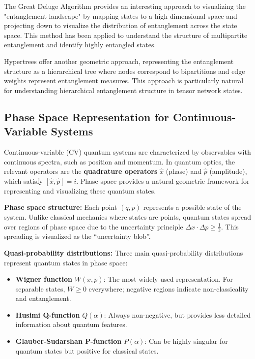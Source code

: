 \documentclass[%
 amsmath,amssymb,
 aps,
rmp,
]{revtex4-2}
\begin{document}
The Great Deluge Algorithm provides an interesting approach to visualizing the "entanglement landscape" by mapping states to a high-dimensional space and projecting down to visualize the distribution of entanglement across the state space. This method has been applied to understand the structure of multipartite entanglement and identify highly entangled states.

Hypertrees offer another geometric approach, representing the entanglement structure as a hierarchical tree where nodes correspond to bipartitions and edge weights represent entanglement measures. This approach is particularly natural for understanding hierarchical entanglement structure in tensor network states.











\subsection{Phase Space Representation for Continuous-Variable Systems}
\label{sec:cv-phase-space}

Continuous-variable (CV) quantum systems are characterized by observables with continuous spectra, such as position and momentum. In quantum optics, the relevant operators are the \textbf{quadrature operators} $\hat{x}$ (phase) and $\hat{p}$ (amplitude), which satisfy $[\hat{x}, \hat{p}] = i$. Phase space provides a natural geometric framework for representing and visualizing these quantum states.

\textbf{Phase space structure:} Each point $(q, p)$ represents a possible state of the system. Unlike classical mechanics where states are points, quantum states spread over regions of phase space due to the uncertainty principle $\Delta x \cdot \Delta p \geq \frac{1}{2}$. This spreading is visualized as the ``uncertainty blob''.

\textbf{Quasi-probability distributions:} Three main quasi-probability distributions represent quantum states in phase space:

\begin{itemize}
	\item \textbf{Wigner function} $W(x,p)$: The most widely used representation. For separable states, $W \geq 0$ everywhere; negative regions indicate non-classicality and entanglement.
	\item \textbf{Husimi Q-function} $Q(\alpha)$: Always non-negative, but provides less detailed information about quantum features.
	\item \textbf{Glauber-Sudarshan P-function} $P(\alpha)$: Can be highly singular for quantum states but positive for classical states.
\end{itemize}
\end{document}
